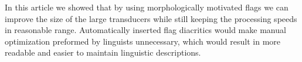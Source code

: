 \documentclass[11pt]{article}
\begin{document}
In this article we showed that by using morphologically motivated flags we can
improve the size of the large transducers while still keeping the processing speeds in reasonable range. 
Automatically inserted flag diacritics would make manual optimization preformed by linguists unnecessary, which would result in  
more readable and easier to maintain linguistic descriptions.

\end{document}
